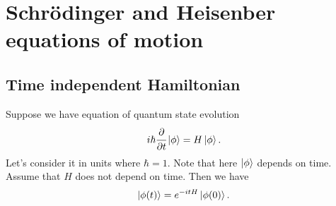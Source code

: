 \documentclass[main.tex]{subfiles}
\begin{document}
%
%
%
\section{Schrödinger and Heisenber equations of motion}

\subsection{Time independent Hamiltonian}

Suppose we have equation of quantum state evolution
\begin{equation}
i\hbar\cfrac{\partial}{\partial t} \ket{\phi} = H\ket{\phi}.
\end{equation}
Let's consider it in units where $\hbar = 1$. Note that here $\ket{\phi}$ depends on time. Assume that $H$ does not depend on time.
Then we have
\begin{equation}
\ket{\phi(t)} = e^{-itH}\ket{\phi(0)}.
\end{equation}
\end{document}
